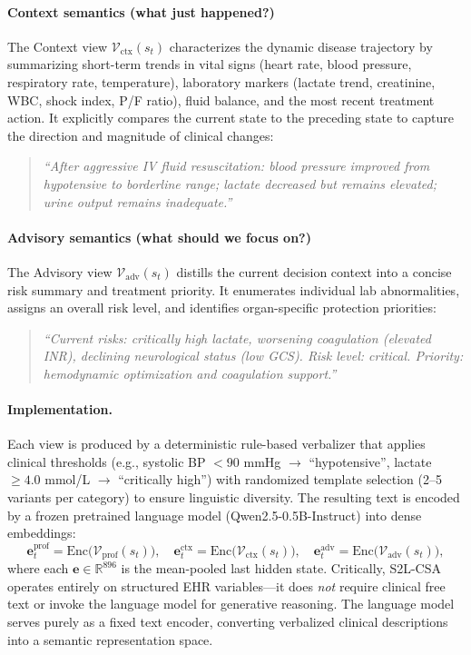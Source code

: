 \paragraph{Context semantics (what just happened?)} The Context view $\mathcal{V}_{\text{ctx}}(s_t)$ characterizes the dynamic disease trajectory by summarizing short-term trends in vital signs (heart rate, blood pressure, respiratory rate, temperature), laboratory markers (lactate trend, creatinine, WBC, shock index, P/F ratio), fluid balance, and the most recent treatment action. It explicitly compares the current state to the preceding state to capture the direction and magnitude of clinical changes:
\begin{quote}
\textit{``After aggressive IV fluid resuscitation: blood pressure improved from hypotensive to borderline range; lactate decreased but remains elevated; urine output remains inadequate.''}
\end{quote}

\paragraph{Advisory semantics (what should we focus on?)} The Advisory view $\mathcal{V}_{\text{adv}}(s_t)$ distills the current decision context into a concise risk summary and treatment priority. It enumerates individual lab abnormalities, assigns an overall risk level, and identifies organ-specific protection priorities:
\begin{quote}
\textit{``Current risks: critically high lactate, worsening coagulation (elevated INR), declining neurological status (low GCS). Risk level: critical. Priority: hemodynamic optimization and coagulation support.''}
\end{quote}

\paragraph{Implementation.} Each view is produced by a deterministic rule-based verbalizer that applies clinical thresholds (e.g., systolic BP $< 90$ mmHg $\to$ ``hypotensive'', lactate $\geq 4.0$ mmol/L $\to$ ``critically high'') with randomized template selection (2--5 variants per category) to ensure linguistic diversity. The resulting text is encoded by a frozen pretrained language model (Qwen2.5-0.5B-Instruct) into dense embeddings:
\begin{equation}
    \mathbf{e}^{\text{prof}}_t = \text{Enc}\bigl(\mathcal{V}_{\text{prof}}(s_t)\bigr), \quad
    \mathbf{e}^{\text{ctx}}_t = \text{Enc}\bigl(\mathcal{V}_{\text{ctx}}(s_t)\bigr), \quad
    \mathbf{e}^{\text{adv}}_t = \text{Enc}\bigl(\mathcal{V}_{\text{adv}}(s_t)\bigr),
\end{equation}
where each $\mathbf{e} \in \mathbb{R}^{896}$ is the mean-pooled last hidden state. Critically, S2L-CSA operates entirely on structured EHR variables---it does \textit{not} require clinical free text or invoke the language model for generative reasoning. The language model serves purely as a fixed text encoder, converting verbalized clinical descriptions into a semantic representation space.

